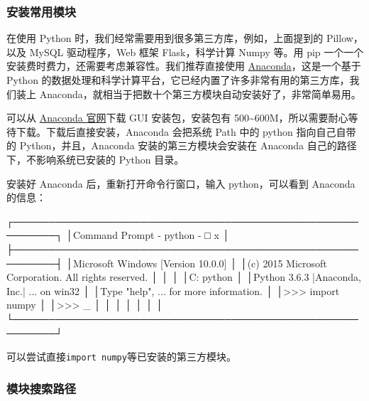 \hypertarget{ux5b89ux88c5ux5e38ux7528ux6a21ux5757}{%
\subsubsection{安装常用模块}\label{ux5b89ux88c5ux5e38ux7528ux6a21ux5757}}

在使用 Python 时，我们经常需要用到很多第三方库，例如，上面提到的
Pillow，以及 MySQL 驱动程序，Web 框架 Flask，科学计算 Numpy 等。用 pip
一个一个安装费时费力，还需要考虑兼容性。我们推荐直接使用
\href{https://www.anaconda.com/}{Anaconda}，这是一个基于 Python
的数据处理和科学计算平台，它已经内置了许多非常有用的第三方库，我们装上
Anaconda，就相当于把数十个第三方模块自动安装好了，非常简单易用。

可以从 \href{https://www.anaconda.com/download/}{Anaconda 官网}下载 GUI
安装包，安装包有
500\textasciitilde600M，所以需要耐心等待下载。下载后直接安装，Anaconda
会把系统 Path 中的 python 指向自己自带的 Python，并且，Anaconda
安装的第三方模块会安装在 Anaconda 自己的路径下，不影响系统已安装的
Python 目录。

安装好 Anaconda 后，重新打开命令行窗口，输入 python，可以看到 Anaconda
的信息：

\begin{pythoncode}
┌────────────────────────────────────────────────────────┐
│Command Prompt - python                           - □ x │
├────────────────────────────────────────────────────────┤
│Microsoft Windows [Version 10.0.0]                      │
│(c) 2015 Microsoft Corporation. All rights reserved.    │
│                                                        │
│C:\> python                                             │
│Python 3.6.3 |Anaconda, Inc.| ... on win32              │
│Type "help", ... for more information.                  │
│>>> import numpy                                        │
│>>> _                                                   │
│                                                        │
│                                                        │
│                                                        │
└────────────────────────────────────────────────────────┘
\end{pythoncode}

可以尝试直接\texttt{import\ numpy}等已安装的第三方模块。

\hypertarget{ux6a21ux5757ux641cux7d22ux8defux5f84}{%
\subsubsection{模块搜索路径}\label{ux6a21ux5757ux641cux7d22ux8defux5f84}}

